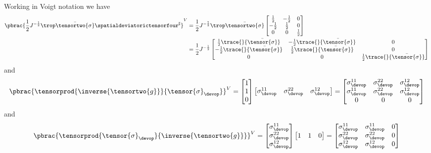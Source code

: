 Working in Voigt notation we have
\begin{equation}
  \begin{split}
    \pbrac{\dfrac{1}{2}J^{-\frac{1}{2}}\trop\bar{\tensortwo{\sigma}}\spatialdeviatorictensorfour^{\sharp}}^{V}&=\dfrac{1}{2}J^{-\frac{1}{2}}\trop\bar{\tensortwo{\sigma}}\begin{bmatrix}
      \frac{1}{2} & -\frac{1}{2} & 0 \\
      -\frac{1}{2} & \frac{1}{2} & 0 \\
      0 & 0 & \frac{1}{2}
    \end{bmatrix} \\
    &=\dfrac{1}{2}J^{-\frac{1}{2}}\begin{bmatrix}
     \frac{1}{2}\trace{}{\bar{\tensor{\sigma}}} & -\frac{1}{2}\trace{}{\bar{\tensor{\sigma}}} & 0 \\
      -\frac{1}{2}\trace{}{\bar{\tensor{\sigma}}} & \frac{1}{2}\trace{}{\bar{\tensor{\sigma}}} & 0 \\
      0 & 0 & \frac{1}{2}\trace{}{\bar{\tensor{\sigma}}}
    \end{bmatrix} 
  \end{split}
\end{equation}
and
\begin{equation}
  \pbrac{\tensorprod{\inverse{\tensortwo{g}}}{\tensor{\sigma}_{\devop}}}^{V}=\begin{bmatrix}
  1 \\
  1 \\
  0
  \end{bmatrix}\begin{bmatrix}
    \sigma_{\devop}^{11} & \sigma_{\devop}^{22} & \sigma_{\devop}^{12}
  \end{bmatrix}=\begin{bmatrix}
  \sigma_{\devop}^{11} & \sigma_{\devop}^{22} & \sigma_{\devop}^{12} \\
  \sigma_{\devop}^{11} & \sigma_{\devop}^{22} & \sigma_{\devop}^{12} \\
  0 & 0 & 0
  \end{bmatrix}
\end{equation}
and
\begin{equation}
  \pbrac{\tensorprod{\tensor{\sigma}_{\devop}}{\inverse{\tensortwo{g}}}}^{V}=\begin{bmatrix}
  \sigma_{\devop}^{11} \\
  \sigma_{\devop}^{22} \\
  \sigma_{\devop}^{12}
  \end{bmatrix}\begin{bmatrix}
  1 & 1 & 0
  \end{bmatrix}=\begin{bmatrix}
  \sigma_{\devop}^{11} & \sigma_{\devop}^{11} & 0 \\
  \sigma_{\devop}^{22} & \sigma_{\devop}^{22} & 0 \\
  \sigma_{\devop}^{12} & \sigma_{\devop}^{12} & 0
  \end{bmatrix}
\end{equation}
